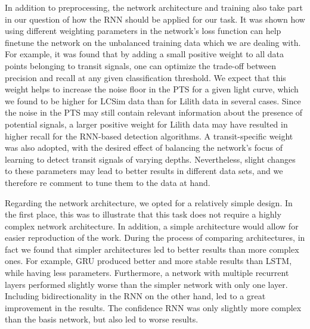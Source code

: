 In addition to preprocessing, the network architecture and training also take part in our question of how the RNN should be applied for our task. It was shown how using different weighting parameters in the network's loss function can help finetune the network on the unbalanced training data which we are dealing with. For example, it was found that by adding a small positive weight to all data points belonging to transit signals, one can optimize the trade-off between precision and recall at any given classification threshold. We expect that this weight helps to increase the noise floor in the PTS for a given light curve, which we found to be higher for LCSim data than for Lilith data in several cases. Since the noise in the PTS may still contain relevant information about the presence of potential signals, a larger positive weight for Lilith data may have resulted in higher recall for the RNN-based detection algorithms. A transit-specific weight was also adopted, with the desired effect of balancing the network's focus of learning to detect transit signals of varying depths. Nevertheless, slight changes to these parameters may lead to better results in different data sets, and we therefore re comment to tune them to the data at hand.

Regarding the network architecture, we opted for a relatively simple design. In the first place, this was to illustrate that this task does not require a highly complex network architecture. In addition, a simple architecture would allow for easier reproduction of the work. During the process of comparing architectures, in fact we found that simpler architectures led to better results than more complex ones. For example, GRU produced better and more stable results than LSTM, while having less parameters. Furthermore, a network with multiple recurrent layers performed slightly worse than the simpler network with only one layer. Including bidirectionality in the RNN on the other hand, led to a great improvement in the results. The confidence RNN was only slightly more complex than the basis network, but also led to worse results.


